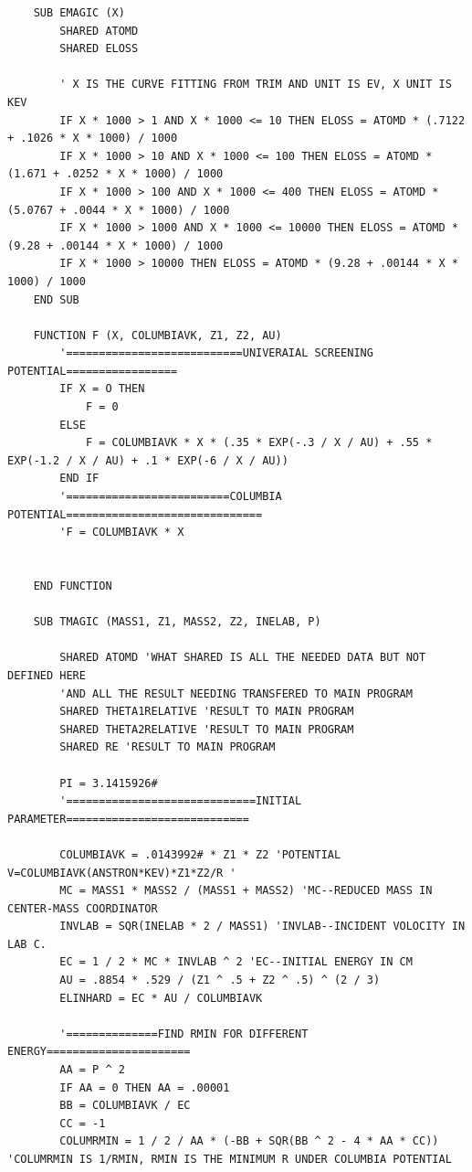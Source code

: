 \documentclass[10pt, reqno]{exam}
\begin{document}
\begin{verbatim}
    SUB EMAGIC (X)
        SHARED ATOMD
        SHARED ELOSS
    
        ' X IS THE CURVE FITTING FROM TRIM AND UNIT IS EV, X UNIT IS KEV
        IF X * 1000 > 1 AND X * 1000 <= 10 THEN ELOSS = ATOMD * (.7122 + .1026 * X * 1000) / 1000
        IF X * 1000 > 10 AND X * 1000 <= 100 THEN ELOSS = ATOMD * (1.671 + .0252 * X * 1000) / 1000
        IF X * 1000 > 100 AND X * 1000 <= 400 THEN ELOSS = ATOMD * (5.0767 + .0044 * X * 1000) / 1000
        IF X * 1000 > 1000 AND X * 1000 <= 10000 THEN ELOSS = ATOMD * (9.28 + .00144 * X * 1000) / 1000
        IF X * 1000 > 10000 THEN ELOSS = ATOMD * (9.28 + .00144 * X * 1000) / 1000
    END SUB
    
    FUNCTION F (X, COLUMBIAVK, Z1, Z2, AU)
        '===========================UNIVERAIAL SCREENING POTENTIAL=================
        IF X = O THEN
            F = 0
        ELSE
            F = COLUMBIAVK * X * (.35 * EXP(-.3 / X / AU) + .55 * EXP(-1.2 / X / AU) + .1 * EXP(-6 / X / AU))
        END IF
        '=========================COLUMBIA POTENTIAL==============================
        'F = COLUMBIAVK * X
    
    
    END FUNCTION
    
    SUB TMAGIC (MASS1, Z1, MASS2, Z2, INELAB, P)
    
        SHARED ATOMD 'WHAT SHARED IS ALL THE NEEDED DATA BUT NOT DEFINED HERE
        'AND ALL THE RESULT NEEDING TRANSFERED TO MAIN PROGRAM
        SHARED THETA1RELATIVE 'RESULT TO MAIN PROGRAM
        SHARED THETA2RELATIVE 'RESULT TO MAIN PROGRAM
        SHARED RE 'RESULT TO MAIN PROGRAM
    
        PI = 3.1415926#
        '=============================INITIAL PARAMETER============================
    
        COLUMBIAVK = .0143992# * Z1 * Z2 'POTENTIAL V=COLUMBIAVK(ANSTRON*KEV)*Z1*Z2/R '
        MC = MASS1 * MASS2 / (MASS1 + MASS2) 'MC--REDUCED MASS IN CENTER-MASS COORDINATOR
        INVLAB = SQR(INELAB * 2 / MASS1) 'INVLAB--INCIDENT VOLOCITY IN LAB C.
        EC = 1 / 2 * MC * INVLAB ^ 2 'EC--INITIAL ENERGY IN CM
        AU = .8854 * .529 / (Z1 ^ .5 + Z2 ^ .5) ^ (2 / 3)
        ELINHARD = EC * AU / COLUMBIAVK
    
        '==============FIND RMIN FOR DIFFERENT ENERGY======================
        AA = P ^ 2
        IF AA = 0 THEN AA = .00001
        BB = COLUMBIAVK / EC
        CC = -1
        COLUMRMIN = 1 / 2 / AA * (-BB + SQR(BB ^ 2 - 4 * AA * CC)) 'COLUMRMIN IS 1/RMIN, RMIN IS THE MINIMUM R UNDER COLUMBIA POTENTIAL
    

\end{verbatim}
\end{document}
